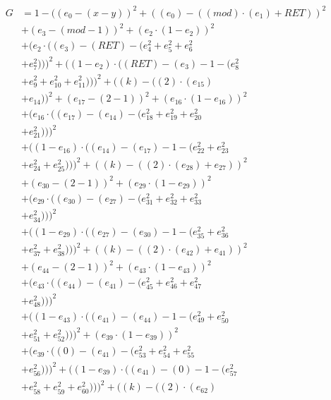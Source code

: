 \documentclass[10pt, a4paper]{article}
\begin{document}
\begin{small}
\begin{align*}
G &= 1 - ((e_{0} - (x - y))^{2} + ((e_{0}) - ((mod)  \cdot  (e_{1}) + RET))^{2} \\
& + (e_{3} - (mod - 1))^{2} + (e_{2}  \cdot  (1 - e_{2}))^{2} \\
& + (e_{2}  \cdot  ((e_{3}) - (RET) - (e_{4}^{2} + e_{5}^{2} + e_{6}^{2} \\
& + e_{7}^{2})))^{2} + ((1 - e_{2})  \cdot  ((RET) - (e_{3}) - 1 - (e_{8}^{2} \\
& + e_{9}^{2} + e_{10}^{2} + e_{11}^{2})))^{2} + ((k) - ((2)  \cdot  (e_{15}) \\
& + e_{14}))^{2} + (e_{17} - (2 - 1))^{2} + (e_{16}  \cdot  (1 - e_{16}))^{2} \\
& + (e_{16}  \cdot  ((e_{17}) - (e_{14}) - (e_{18}^{2} + e_{19}^{2} + e_{20}^{2} \\
& + e_{21}^{2})))^{2} \\
& + ((1 - e_{16})  \cdot  ((e_{14}) - (e_{17}) - 1 - (e_{22}^{2} + e_{23}^{2} \\
& + e_{24}^{2} + e_{25}^{2})))^{2} + ((k) - ((2)  \cdot  (e_{28}) + e_{27}))^{2} \\
& + (e_{30} - (2 - 1))^{2} + (e_{29}  \cdot  (1 - e_{29}))^{2} \\
& + (e_{29}  \cdot  ((e_{30}) - (e_{27}) - (e_{31}^{2} + e_{32}^{2} + e_{33}^{2} \\
& + e_{34}^{2})))^{2} \\
& + ((1 - e_{29})  \cdot  ((e_{27}) - (e_{30}) - 1 - (e_{35}^{2} + e_{36}^{2} \\
& + e_{37}^{2} + e_{38}^{2})))^{2} + ((k) - ((2)  \cdot  (e_{42}) + e_{41}))^{2} \\
& + (e_{44} - (2 - 1))^{2} + (e_{43}  \cdot  (1 - e_{43}))^{2} \\
& + (e_{43}  \cdot  ((e_{44}) - (e_{41}) - (e_{45}^{2} + e_{46}^{2} + e_{47}^{2} \\
& + e_{48}^{2})))^{2} \\
& + ((1 - e_{43})  \cdot  ((e_{41}) - (e_{44}) - 1 - (e_{49}^{2} + e_{50}^{2} \\
& + e_{51}^{2} + e_{52}^{2})))^{2} + (e_{39}  \cdot  (1 - e_{39}))^{2} \\
& + (e_{39}  \cdot  ((0) - (e_{41}) - (e_{53}^{2} + e_{54}^{2} + e_{55}^{2} \\
& + e_{56}^{2})))^{2} + ((1 - e_{39})  \cdot  ((e_{41}) - (0) - 1 - (e_{57}^{2} \\
& + e_{58}^{2} + e_{59}^{2} + e_{60}^{2})))^{2} + ((k) - ((2)  \cdot  (e_{62}) \\

\end{align*}
\end{small}
\end{document}
